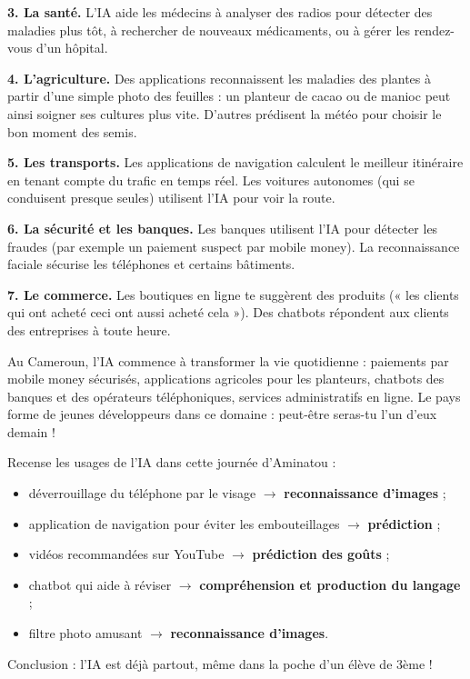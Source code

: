 \documentclass[11pt]{article}
\begin{document}
\textbf{3. La santé.} L'IA aide les médecins à analyser des radios pour détecter des maladies plus tôt, à rechercher de nouveaux médicaments, ou à gérer les rendez-vous d'un hôpital.

\textbf{4. L'agriculture.} Des applications reconnaissent les maladies des plantes à partir d'une simple photo des feuilles : un planteur de cacao ou de manioc peut ainsi soigner ses cultures plus vite. D'autres prédisent la météo pour choisir le bon moment des semis.

\textbf{5. Les transports.} Les applications de navigation calculent le meilleur itinéraire en tenant compte du trafic en temps réel. Les voitures autonomes (qui se conduisent presque seules) utilisent l'IA pour voir la route.

\textbf{6. La sécurité et les banques.} Les banques utilisent l'IA pour détecter les fraudes (par exemple un paiement suspect par mobile money). La reconnaissance faciale sécurise les téléphones et certains bâtiments.

\textbf{7. Le commerce.} Les boutiques en ligne te suggèrent des produits (« les clients qui ont acheté ceci ont aussi acheté cela »). Des chatbots répondent aux clients des entreprises à toute heure.

\begin{savaistu}[L'IA au Cameroun]
Au Cameroun, l'IA commence à transformer la vie quotidienne : paiements par mobile money sécurisés, applications agricoles pour les planteurs, chatbots des banques et des opérateurs téléphoniques, services administratifs en ligne. Le pays forme de jeunes développeurs dans ce domaine : peut-être seras-tu l'un d'eux demain !
\end{savaistu}

\begin{exemplebox}
Recense les usages de l'IA dans cette journée d'Aminatou :
\begin{itemize}
\item déverrouillage du téléphone par le visage $\rightarrow$ \textbf{reconnaissance d'images} ;
\item application de navigation pour éviter les embouteillages $\rightarrow$ \textbf{prédiction} ;
\item vidéos recommandées sur YouTube $\rightarrow$ \textbf{prédiction des goûts} ;
\item chatbot qui aide à réviser $\rightarrow$ \textbf{compréhension et production du langage} ;
\item filtre photo amusant $\rightarrow$ \textbf{reconnaissance d'images}.
\end{itemize}
Conclusion : l'IA est déjà partout, même dans la poche d'un élève de 3ème !
\end{exemplebox}
\end{document}
